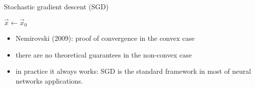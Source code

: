 \begin{frame}{Stochastic gradient descent (SGD)}
\begin{algorithm}[H]
	
	\BlankLine
	
	$\vec{x} \gets \vec{x}_0$\\
	\caption{Stochastic gradient descent}
	\label{algo:sgd}
\end{algorithm}	
\end{frame}
\begin{frame}{}
	\begin{itemize}
		\item Nemirovski (2009)\cite{Nemirovski}: proof of convergence in the convex case
		\item there are no theoretical guarantees in the non-convex case 
		\item in practice it always works: SGD is the standard framework in most of neural networks applications.
	\end{itemize}
\end{frame}